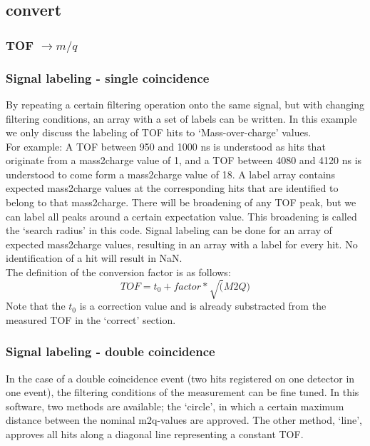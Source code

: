 \newpage
\subsection{convert}

\subsubsection{TOF $\rightarrow m/q$}

\subsubsection{Signal labeling - single coincidence}
By repeating a certain filtering operation onto the same signal, but with changing filtering conditions, an array with a set of labels can be written. In this example we only discuss the labeling of TOF hits to `Mass-over-charge' values.\\
For example: A TOF between 950 and 1000 ns is understood as hits that originate from a mass2charge value of 1, and a TOF between 4080 and 4120 ns is understood to come form a mass2charge value of 18. A label array contains expected mass2charge values at the corresponding hits that are identified to belong to that mass2charge. There will be broadening of any TOF peak, but we can label all peaks around a certain expectation value. This broadening is called the `search radius' in this code. Signal labeling can be done for an array of expected mass2charge values, resulting in an array with a label for every hit. No identification of a hit will result in NaN. \\
The definition of the conversion factor is as follows:
\begin{equation}
TOF = t_0 + factor*\sqrt(M2Q)
\end{equation}
Note that the $t_0$ is a correction value and is already substracted from the measured TOF in the `correct' section.

\subsubsection{Signal labeling - double coincidence}
In the case of a double coincidence event (two hits registered on one detector in one event), the filtering conditions of the measurement can be fine tuned. In this software, two methods are available;  the `circle', in which a certain maximum distance between the nominal m2q-values are approved. The other method, `line', approves all hits along a diagonal line representing a constant TOF. 

